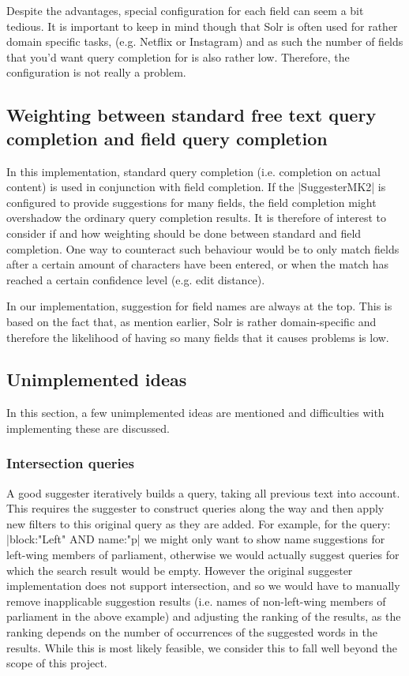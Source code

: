 Despite the advantages, special configuration for each field can seem a bit tedious. It is important to keep in mind though that Solr is often used for rather domain specific tasks, (e.g. Netflix or Instagram) and as such the number of fields that you’d want query completion for is also rather low. Therefore, the configuration is not really a problem.  

\subsection{Weighting between standard free text query completion and field query completion}

In this implementation, standard query completion (i.e. completion on actual content) is used in conjunction with field completion. If the |SuggesterMK2| is configured to provide suggestions for many fields, the field completion might overshadow the ordinary query completion results.
It is therefore of interest to consider if and how weighting should be done between standard and field completion. One way to counteract such behaviour would be to only match fields after a certain amount of characters have been entered, or when the match has reached a certain confidence level (e.g. edit distance).

In our implementation, suggestion for field names are always at the top. This is based on the fact that, as mention earlier,  Solr is rather domain-specific and therefore the likelihood of having so many fields that it causes problems is low.

\subsection{Unimplemented ideas}

In this section, a few unimplemented ideas are mentioned and difficulties with implementing these are discussed. 

\subsubsection{Intersection queries}

A good suggester iteratively builds a query, taking all previous text into account. This requires the suggester to construct queries along the way and then apply new filters to this original query as they are added. For example, for the query: |block:"Left" AND name:"p| we might only want to show name suggestions for left-wing members of parliament, otherwise we would actually suggest queries for which the search result would be empty.
However the original suggester implementation does not support intersection, and so we would have to manually remove inapplicable suggestion results (i.e. names of non-left-wing members of parliament in the above example) and adjusting the ranking of the results, as the ranking depends on the number of occurrences of the suggested words in the results. While this is most likely feasible, we consider this to fall well beyond the scope of this project.

